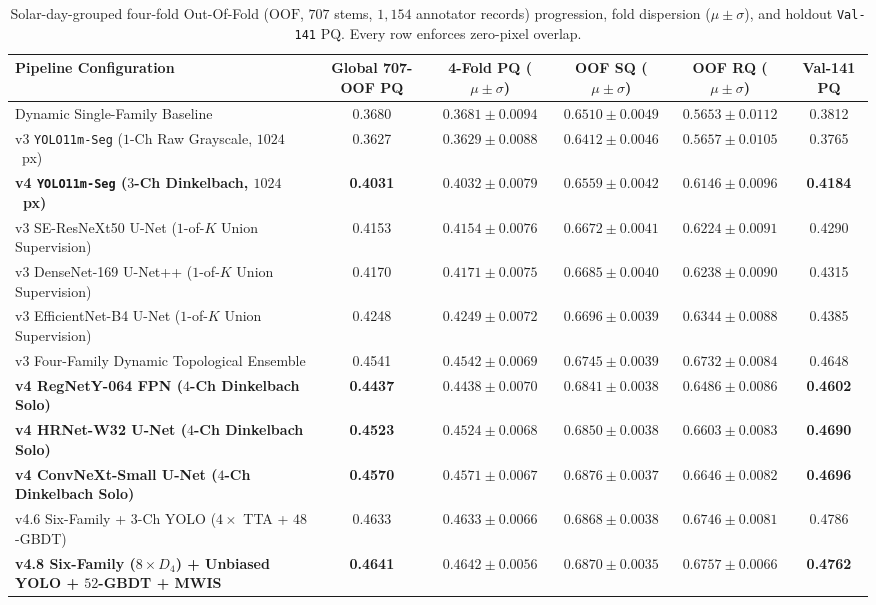 \documentclass[sigconf]{acmart}
\begin{document}
\begin{table}[t]
  \centering
  \footnotesize
  \caption{Solar-day-grouped four-fold Out-Of-Fold ($\mathrm{OOF}$, $707$ stems, $1{,}154$ annotator records) progression, fold dispersion ($\mu\pm\sigma$), and holdout \texttt{Val-141} $\mathrm{PQ}$. Every row enforces zero-pixel overlap.}
  \label{tab:ablation}
  \begin{tabular}{lccccc}
    \toprule
    Pipeline Configuration & Global 707-OOF PQ & 4-Fold PQ ($\mu \pm \sigma$) & OOF SQ ($\mu \pm \sigma$) & OOF RQ ($\mu \pm \sigma$) & Val-141 PQ \\
    \midrule
    Dynamic Single-Family Baseline & 0.3680 & $0.3681 \pm 0.0094$ & $0.6510 \pm 0.0049$ & $0.5653 \pm 0.0112$ & 0.3812 \\
    v3 \texttt{YOLO11m-Seg} ($1$-Ch Raw Grayscale, $1024$~px) & 0.3627 & $0.3629 \pm 0.0088$ & $0.6412 \pm 0.0046$ & $0.5657 \pm 0.0105$ & 0.3765 \\
    \textbf{v4 \texttt{YOLO11m-Seg} ($3$-Ch Dinkelbach, $1024$~px)} & \textbf{0.4031} & $\mathbf{0.4032 \pm 0.0079}$ & $\mathbf{0.6559 \pm 0.0042}$ & $\mathbf{0.6146 \pm 0.0096}$ & \textbf{0.4184} \\
    \midrule
    v3 SE-ResNeXt50 U-Net ($1$-of-$K$ Union Supervision) & 0.4153 & $0.4154 \pm 0.0076$ & $0.6672 \pm 0.0041$ & $0.6224 \pm 0.0091$ & 0.4290 \\
    v3 DenseNet-169 U-Net++ ($1$-of-$K$ Union Supervision) & 0.4170 & $0.4171 \pm 0.0075$ & $0.6685 \pm 0.0040$ & $0.6238 \pm 0.0090$ & 0.4315 \\
    v3 EfficientNet-B4 U-Net ($1$-of-$K$ Union Supervision) & 0.4248 & $0.4249 \pm 0.0072$ & $0.6696 \pm 0.0039$ & $0.6344 \pm 0.0088$ & 0.4385 \\
    v3 Four-Family Dynamic Topological Ensemble & 0.4541 & $0.4542 \pm 0.0069$ & $0.6745 \pm 0.0039$ & $0.6732 \pm 0.0084$ & 0.4648 \\
    \midrule
    \textbf{v4 RegNetY-064 FPN ($4$-Ch Dinkelbach Solo)} & \textbf{0.4437} & $\mathbf{0.4438 \pm 0.0070}$ & $\mathbf{0.6841 \pm 0.0038}$ & $\mathbf{0.6486 \pm 0.0086}$ & \textbf{0.4602} \\
    \textbf{v4 HRNet-W32 U-Net ($4$-Ch Dinkelbach Solo)} & \textbf{0.4523} & $\mathbf{0.4524 \pm 0.0068}$ & $\mathbf{0.6850 \pm 0.0038}$ & $\mathbf{0.6603 \pm 0.0083}$ & \textbf{0.4690} \\
    \textbf{v4 ConvNeXt-Small U-Net ($4$-Ch Dinkelbach Solo)} & \textbf{0.4570} & $\mathbf{0.4571 \pm 0.0067}$ & $\mathbf{0.6876 \pm 0.0037}$ & $\mathbf{0.6646 \pm 0.0082}$ & \textbf{0.4696} \\
    \midrule
    v4.6 Six-Family + $3$-Ch YOLO ($4\times$ TTA + $48$-GBDT) & 0.4633 & $0.4633 \pm 0.0066$ & $0.6868 \pm 0.0038$ & $0.6746 \pm 0.0081$ & 0.4786 \\
    \textbf{v4.8 Six-Family ($8\times D_4$) + Unbiased YOLO + $52$-GBDT + MWIS} & \textbf{0.4641} & $\mathbf{0.4642 \pm 0.0056}$ & $\mathbf{0.6870 \pm 0.0035}$ & $\mathbf{0.6757 \pm 0.0066}$ & \textbf{0.4762} \\
    \bottomrule
  \end{tabular}
\end{table}
\end{document}
